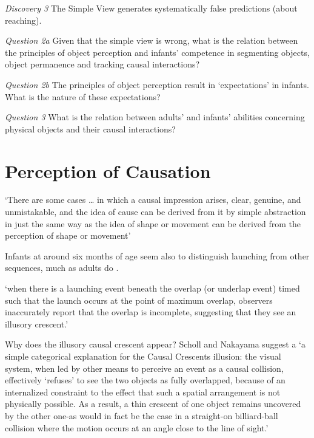 \documentclass[12pt]{extarticle}
\begin{document}
\begin{multicols}{3}
\emph{Discovery 3}  The Simple View generates systematically false predictions (about reaching).
 
\emph{Question 2a} Given that the simple view is wrong, what is the relation between the principles of object perception and infants’ competence in segmenting objects, object permanence and tracking causal interactions?
 
\emph{Question 2b} The principles of object perception result in ‘expectations’ in infants.  What is the nature of these expectations?
 
\emph{Question 3} What is the relation between adults’ and infants’ abilities concerning physical objects and their causal interactions?
 
 
 
\section{Perception of Causation}
 
‘There are some cases … in which a causal impression arises, clear, genuine, and unmistakable, 
and the idea of cause can be derived from it by simple abstraction in just the same way as the 
idea of shape or movement can be derived from the perception of shape or movement’ 
\citep[p.\ 270--1]{Michotte:1946nz}
 
Infants at around six months of age seem also to distinguish launching from other sequences, 
much as adults do \citep{Leslie:1987nr}.
 
‘when there is a launching event beneath the overlap (or underlap event) timed such that 
the launch occurs at the point of maximum overlap, observers inaccurately report that 
the overlap is incomplete, suggesting that they see an illusory crescent.’ 
\citep[p.\ 461]{Scholl:2004dx}
 
Why does the illusory causal crescent appear?  Scholl and Nakayama suggest a  
‘a simple categorical explanation for the Causal Crescents illusion: the visual system, 
when led by other means to perceive an event as a causal collision, effectively 
‘refuses’ to see the two objects as fully overlapped, because of an internalized 
constraint to the effect that such a spatial arrangement is not physically possible. 
As a result, a thin crescent of one object remains uncovered by the other one-as 
would in fact be the case in a straight-on billiard-ball collision where the motion 
occurs at an angle close to the line of sight.’ 
\citep[p.\ 466]{Scholl:2004dx}
 

\end{multicols}
\end{document}
